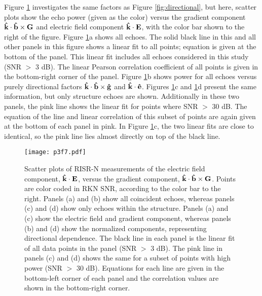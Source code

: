 Figure \ref{fig:eg_scatter} investigates the same factors as Figure \ref{fig:directional}, but here, scatter plots show the echo power (given as the color) versus the gradient component \(\mathbf{\hat{k}}\cdot\mathbf{\hat{b}}\times\mathbf{G}\) and electric field component \(\mathbf{\hat{k}}\cdot\mathbf{E}\), with the color bar shown to the right of the figure.  Figure \ref{fig:eg_scatter}a shows all echoes.  The solid black line in this and all other panels in this figure shows a linear fit to all points; equation is given at the bottom of the panel.  This linear fit includes all echoes considered in this study (SNR $>$ 3 dB).  The linear Pearson correlation coefficient of all points is given in the bottom-right corner of the panel.  Figure \ref{fig:eg_scatter}b shows power for all echoes versus purely directional factors \(\mathbf{\hat{k}}\cdot\mathbf{\hat{b}}\times\mathbf{\hat{g}}\) and \(\mathbf{\hat{k}}\cdot\mathbf{\hat{e}}\).  Figures \ref{fig:eg_scatter}c and \ref{fig:eg_scatter}d present the same information, but only structure echoes are shown.  Additionally in these two panels, the pink line shows the linear fit for points where SNR \(>\) 30 dB.  The equation of the line and linear correlation of this subset of points are again given at the bottom of each panel in pink.  In Figure \ref{fig:eg_scatter}c, the two linear fits are close to identical, so the pink line lies almost directly on top of the black line.

\begin{figure}
\texttt{[image: p3f7.pdf]}
  \caption[Relationship between the electric field and gradient components]{Scatter plots of RISR-N measurements of the electric field component, \(\mathbf{\hat{k}}\cdot\mathbf{E}\), versus the gradient component, \(\mathbf{\hat{k}}\cdot\mathbf{\hat{b}}\times\mathbf{G}\).  Points are color coded in RKN SNR, according to the color bar to the right.  Panels (a) and (b) show all coincident echoes, whereas panels (c) and (d) show only echoes within the structure.  Panels (a) and (c) show the electric field and gradient component, whereas panels (b) and (d) show the normalized components, representing directional dependence.  The black line in each panel is the linear fit of all data points in the panel (SNR \(>\) 3 dB).  The pink line in panels (c) and (d) shows the same for a subset of points with high power (SNR \(>\) 30 dB).  Equations for each line are given in the bottom-left corner of each panel and the correlation values are shown in the bottom-right corner.}
  \label{fig:eg_scatter}
\end{figure}


